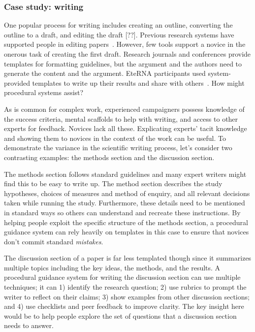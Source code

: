 \subsubsection{Case study: writing}
One popular process for writing includes creating an outline, converting the outline to a draft, and editing the draft [??]. Previous research systems have supported people in editing papers~\cite{Bernstein2010a}. However, few tools support a novice in the onerous task of creating the first draft. Research journals and conferences provide templates for formatting guidelines, but the argument and the authors need to generate the content and the argument. EteRNA participants used system-provided templates to write up their results and share with others~\cite{Lee2014}. How might procedural systems assist?

As is common for complex work, experienced campaigners possess knowledge of the success criteria, mental scaffolds to help with writing, and access to other experts for feedback. Novices lack all these. Explicating experts' tacit knowledge and showing them to novices in the context of the work can be useful. To demonstrate the variance in the scientific writing process, let’s consider two contrasting examples: the methods section and the discussion section.

The methods section follows standard guidelines and many expert writers might find this to be easy to write up. The method section describes the study hypotheses, choices of measures and method of enquiry, and all relevant decisions taken while running the study. Furthermore, these details need to be mentioned in standard ways so others can understand and recreate these instructions. By helping people exploit the specific structure of the methods section, a procedural guidance system can rely heavily on templates in this case to ensure that novices don't commit standard \textit{mistakes}. 

The discussion section of a paper is far less templated though since it summarizes multiple topics including the key ideas, the methods, and the results. A procedural guidance system for writing the discussion section can use multiple techniques; it can 1) identify the research question; 2) use rubrics to prompt the writer to reflect on their claims; 3) show examples from other discussion sections; and 4) use checklists and peer feedback to improve clarity. The key insight here would be to help people explore the set of questions that a discussion section needs to answer.

